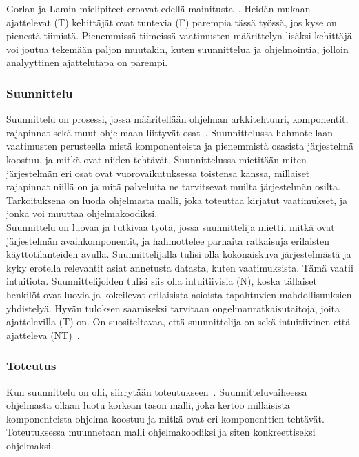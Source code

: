 \documentclass[finnish]{../tktltiki2}
\theoremstyle{definition}
\theoremstyle{remark}
\begin{document}
Gorlan ja Lamin mielipiteet eroavat edellä mainitusta~\cite{Gorla:2004:WWB:990680.990684}. Heidän mukaan ajattelevat (T) kehittäjät ovat tuntevia (F) parempia tässä työssä, jos kyse on pienestä tiimistä. Pienemmissä tiimeissä vaatimusten määrittelyn lisäksi kehittäjä voi joutua tekemään paljon muutakin, kuten suunnittelua ja ohjelmointia, jolloin analyyttinen ajattelutapa on parempi.

\subsubsection{Suunnittelu}

Suunnittelu on prosessi, jossa määritellään ohjelman arkkitehtuuri, komponentit, rajapinnat sekä muut ohjelmaan liittyvät osat~\cite{SWEBOK:409902}.
Suunnittelussa hahmotellaan vaatimusten perusteella mistä komponenteista ja pienemmistä osasista järjestelmä koostuu, ja mitkä ovat niiden tehtävät. Suunnittelussa mietitään miten järjestelmän eri osat ovat vuorovaikutuksessa toistensa kanssa, millaiset rajapinnat niillä on ja mitä palveluita ne tarvitsevat muilta järjestelmän osilta.
Tarkoituksena on luoda ohjelmasta malli, joka toteuttaa kirjatut vaatimukset, ja jonka voi muuttaa ohjelmakoodiksi.\\

Suunnittelu on luovaa ja tutkivaa työtä, jossa suunnittelija miettii mitkä ovat järjestelmän avainkomponentit, ja hahmottelee parhaita ratkaisuja erilaisten käyttötilanteiden avulla. Suunnittelijalla tulisi olla kokonaiskuva järjestelmästä ja kyky erotella relevantit asiat annetusta datasta, kuten vaatimuksista. Tämä vaatii intuitiota.
Suunnittelijoiden tulisi siis olla intuitiivisia (N), koska tällaiset henkilöt ovat luovia ja kokeilevat erilaisista asioista tapahtuvien mahdollisuuksien yhdistelyä. Hyvän tuloksen saamiseksi tarvitaan ongelmanratkaisutaitoja, joita ajattelevilla (T) on. On suositeltavaa, että suunnittelija on sekä intuitiivinen että ajatteleva (NT)~\cite{Capretz:2010:MSS:1726559.1726574}.

\subsubsection{Toteutus}

Kun suunnittelu on ohi, siirrytään toteutukseen~\cite{SWEBOK:409902}. Suunnitteluvaiheessa ohjelmasta ollaan luotu korkean tason malli, joka kertoo millaisista komponenteista ohjelma koostuu
ja mitkä ovat eri komponenttien tehtävät. Toteutuksessa muunnetaan malli ohjelmakoodiksi ja siten konkreettiseksi ohjelmaksi.\\
\end{document}
